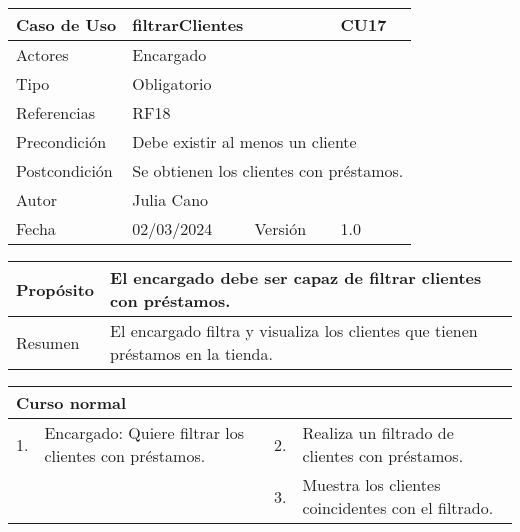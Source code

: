 \begin{table}[H]
	\centering
	\begin{tabular}{| m{} | m{} | m{} | m{}|}
		\hline
		\rowcolor{grayshade} Caso de Uso & \multicolumn{2}{|m{0.43\textwidth}|}{filtrarClientes} &  CU17\\ 
		\hline
		Actores & \multicolumn{3}{l|}{Encargado} \\ 
		\hline
		Tipo & \multicolumn{3}{l|}{Obligatorio} \\ 
		\hline
		Referencias & \multicolumn{3}{l|}{RF18} \\ 
		\hline
		Precondición & \multicolumn{3}{m{0.67\textwidth}|}{Debe existir al menos un cliente} \\ 
		\hline
		Postcondición & \multicolumn{3}{m{0.67\textwidth}|}{Se obtienen los clientes con préstamos.} \\ 
		\hline
		Autor & \multicolumn{3}{l|}{Julia Cano} \\ 
		\hline
		Fecha & 02/03/2024 & Versión & 1.0 \\
		\hline
	\end{tabular}
\end{table}

\begin{table}[H]
	\centering
	\begin{tabular}{| m{} | m{} | m{} | m{} |}
		\hline
		Propósito & \multicolumn{3}{m{0.67\textwidth}|}{El encargado debe ser capaz de filtrar clientes con préstamos.}  \\ 
		\hline
		Resumen & \multicolumn{3}{m{0.67\textwidth}|}{El encargado filtra y visualiza los clientes que tienen préstamos en la tienda.} \\ 
		\hline
	\end{tabular}
\end{table}


\begin{table}[H]
	\centering
	\begin{tabular}{| m{} | m{} | m{} | m{} |}
		\hline
		\multicolumn{4}{|m{0.9\textwidth}|}{Curso normal}     \\ 
		\hline
		1. & Encargado: Quiere filtrar los clientes con préstamos. & 2. &  Realiza un filtrado de clientes con préstamos.  \\ 
		\hline
		&  & 3. &  Muestra los clientes coincidentes con el filtrado.  \\ 
		\hline
	\end{tabular}
\end{table}

